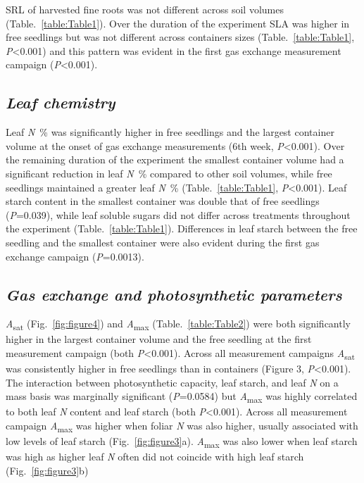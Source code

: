\documentclass[a4paper]{article}\usepackage[]{graphicx}\usepackage[]{color}
\begin{document}
SRL of harvested fine roots was not different across soil volumes (Table.~\ref{table:Table1}). Over the duration of the experiment SLA was higher in free seedlings but was not different across containers sizes (Table.~\ref{table:Table1}, \textit{P}\textless0.001) and this pattern was evident in the first gas exchange measurement campaign (\textit{P}\textless0.001).

\subsection*{\textit{Leaf chemistry}}
Leaf \textit{N}~\% was significantly higher in free seedlings and the largest container volume at the onset of gas exchange measurements (6th week, \textit{P}\textless0.001).  Over the remaining duration of the experiment the smallest container volume had a significant reduction in leaf \textit{N}~\% compared to other soil volumes, while free seedlings maintained a greater leaf \textit{N}~\% (Table.~\ref{table:Table1}, \textit{P}\textless0.001).  Leaf starch content in the smallest container was double that of free seedlings (\textit{P}=0.039), while leaf soluble sugars did not differ across treatments throughout the experiment (Table.~\ref{table:Table1}).  Differences in leaf starch between the free seedling and the smallest container were also evident during the first gas exchange campaign (\textit{P}=0.0013). 

\subsection*{\textit{Gas exchange and photosynthetic parameters}}
\textit{A}\textsubscript{sat} (Fig.~\ref{fig:figure4}) and \textit{A}\textsubscript{max} (Table.~\ref{table:Table2}) were both significantly higher in the largest container volume and the free seedling at the first measurement campaign (both \textit{P}\textless0.001). Across all measurement campaigns \textit{A}\textsubscript{sat} was consistently higher in free seedlings than in containers (Figure 3, \textit{P}\textless0.001). The interaction between photosynthetic capacity, leaf starch, and leaf \textit{N} on a mass basis was marginally significant (\textit{P}=0.0584) but \textit{A}\textsubscript{max} was highly correlated to both leaf \textit{N} content and leaf starch (both \textit{P}\textless0.001). Across all measurement campaign \textit{A}\textsubscript{max} was higher when foliar \textit{N} was also higher, usually associated with low levels of leaf starch (Fig.~\ref{fig:figure3}a). \textit{A}\textsubscript{max} was also lower when leaf starch was high as higher leaf \textit{N} often did not coincide with high leaf starch (Fig.~\ref{fig:figure3}b)
\end{document}
